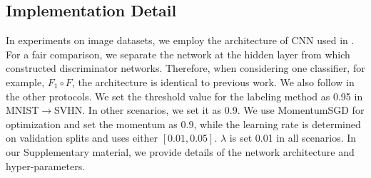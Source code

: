 \documentclass{article}
\begin{document}
\subsection{Implementation Detail}
In experiments on image datasets, we employ the architecture of CNN used in \cite{ganin2014unsupervised}. For a fair comparison, we separate the network at the hidden layer from which \cite{ganin2014unsupervised} constructed discriminator networks. Therefore, when considering one classifier, for example, $F_1 \circ F$, the architecture is identical to previous work. We also follow \cite{ganin2014unsupervised} in the other protocols. We set the threshold value for the labeling method as 0.95 in MNIST$\rightarrow$SVHN. In other scenarios, we set it as 0.9. We use MomentumSGD for optimization and set the momentum as $0.9$, while the learning rate is determined on validation splits and uses either $[0.01, 0.05]$.
$\lambda$ is set 0.01 in all scenarios. In our Supplementary material, we provide details of the network architecture and hyper-parameters.
\end{document}
